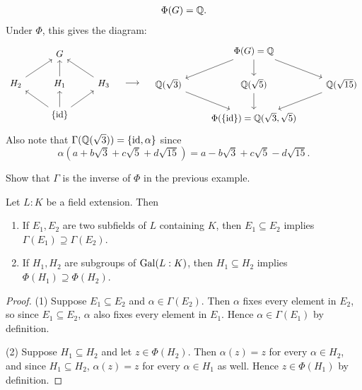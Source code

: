 \begin{example}
\begin{gather*}
    \Phi(G) = \mathbb{Q}.
  \end{gather*}
  Under $\Phi$, this gives the diagram:
  \[
  \begin{tikzcd}
    & G \\
    H_2 \urar & H_1 \uar & H_3 \ular \\
    & \{\id\} \ular \uar \urar
  \end{tikzcd} \quad
  \longrightarrow \quad
  \begin{tikzcd}
    & \Phi(G) = \Q \drar \dar \dlar \\
    \Q(\sqrt{3}) \drar & \Q(\sqrt{5}) \dar & \Q(\sqrt{15}) \dlar \\
    & \Phi(\{\id\}) = \Q(\sqrt{3}, \sqrt{5})
  \end{tikzcd}
  \]
  Also note that
  $\Gamma(\mathbb{Q}(\sqrt{3})) = \{\mathrm{id}, \alpha\}$ since
  \[
    \alpha(a + b\sqrt{3} + c\sqrt{5} + d\sqrt{15})
    = a - b\sqrt{3} + c\sqrt{5} - d\sqrt{15}.
  \]
\end{example}

\begin{exercise}
  Show that $\Gamma$ is the inverse of $\Phi$ in the
  previous example.
\end{exercise}

\begin{theorem}
  Let $L : K$ be a field extension. Then
  \begin{enumerate}
    \item If $E_1, E_2$ are two subfields of $L$
      containing $K$, then
      $E_1 \subseteq E_2$ implies
      $\Gamma(E_1) \supseteq \Gamma(E_2)$.
    \item If $H_1, H_2$ are subgroups of $\operatorname{Gal}(L : K)$,
      then $H_1 \subseteq H_2$ implies
      $\Phi(H_1) \supseteq \Phi(H_2)$.
  \end{enumerate}
\end{theorem}

\begin{proof}
  (1) Suppose $E_1 \subseteq E_2$ and $\alpha \in \Gamma(E_2)$.
  Then $\alpha$ fixes every element in $E_2$, so since
  $E_1 \subseteq E_2$, $\alpha$ also fixes every element
  in $E_1$. Hence $\alpha \in \Gamma(E_1)$ by
  definition.

  (2) Suppose $H_1 \subseteq H_2$ and let $z \in \Phi(H_2)$.
  Then $\alpha(z) = z$ for every $\alpha \in H_2$, and
  since $H_1 \subseteq H_2$, $\alpha(z) = z$ for every
  $\alpha \in H_1$ as well. Hence $z \in \Phi(H_1)$ by
  definition.
\end{proof}

